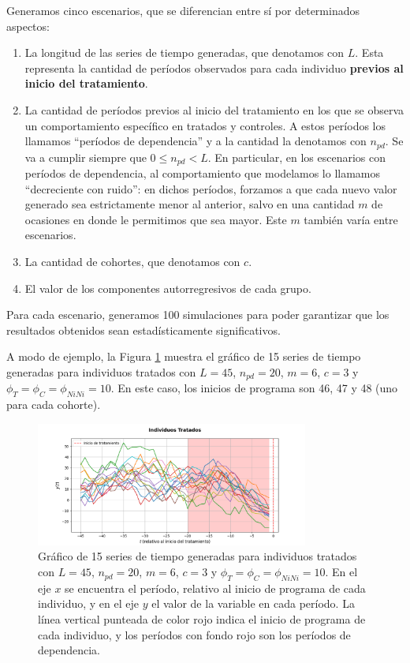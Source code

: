 \documentclass[../../main.tex]{subfiles}
\begin{document}
Generamos cinco escenarios, que se diferencian entre sí por determinados aspectos:
\begin{enumerate}[itemsep=0.05cm, label=\textbf{\arabic*.}]
    \item La longitud de las series de tiempo generadas, que denotamos con \(L\). Esta
    representa la cantidad de períodos observados para cada individuo \textbf{previos al inicio
    del tratamiento}.
    \item La cantidad de períodos previos al inicio del tratamiento en los que se observa
    un comportamiento específico en tratados y controles. A estos períodos los llamamos
    ``períodos de dependencia'' y a la cantidad la denotamos con \(n_{pd}\). Se
    va a cumplir siempre que \(0 \le n_{pd} < L\). En particular, en los
    escenarios con períodos de dependencia, al comportamiento que modelamos lo llamamos
    ``decreciente con ruido'': en dichos períodos, forzamos a que cada nuevo valor
    generado sea estrictamente menor al anterior, salvo en una cantidad \(m\) de ocasiones
    en donde le permitimos que sea mayor. Este \(m\) también varía entre escenarios.
    \item La cantidad de cohortes, que denotamos con \(c\).
    \item El valor de los componentes autorregresivos de cada grupo.
\end{enumerate}
Para cada escenario, generamos 100 simulaciones para poder garantizar que los resultados
obtenidos sean estadísticamente significativos.

A modo de ejemplo, la Figura \ref{fig:treated_series_example} muestra el gráfico de 15 series de tiempo
generadas para individuos tratados con \(L=45\), \(n_{pd}=20\), \(m=6\), \(c=3\) y
\(\phi_T = \phi_C = \phi_{NiNi} = 10\). En este caso, los inicios de programa son
46, 47 y 48 (uno para cada cohorte).

\begin{figure}[h!]
    \centering
    \includegraphics[width=0.8\textwidth]{figs/series_tratados_exp1.png}
    \caption{Gráfico de 15 series de tiempo generadas para individuos tratados con
    \(L=45\), \(n_{pd}=20\), \(m=6\), \(c=3\) y \(\phi_T = \phi_C = \phi_{NiNi} = 10\). En
    el eje \(x\) se encuentra el período, relativo al inicio de programa de cada
    individuo, y en el eje \(y\) el valor de la variable en cada período. La línea
    vertical punteada de color rojo indica el inicio de programa de cada individuo, y los
    períodos con fondo rojo son los períodos de dependencia.}
    \label{fig:treated_series_example}
\end{figure}
\end{document}
